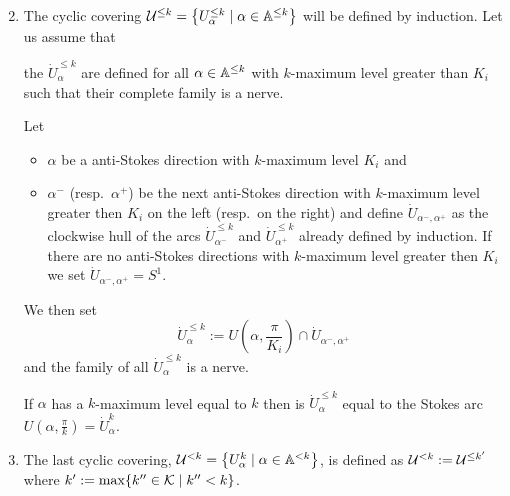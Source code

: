 \begin{enumerate}
  \setcounter{enumi}{1}
  \item The cyclic covering
    $\mathcal{U}^{\leq k}=\left\{U_\alpha^{\leq k}\mid\alpha\in\mathbb{A}^{\leq k}\right\}$
    will be defined by induction.
    Let us assume that
    \begin{einr}
      the $\dot U_\alpha^{\leq k}$ are defined for all $\alpha\in\mathbb{A}^{\leq k}$
      with $k$-maximum level greater than $K_i$ such that their complete family
      is a nerve.
    \end{einr}
    Let
    \begin{itemize}
      \item $\alpha$ be a anti-Stokes direction with $k$-maximum level $K_i$
        and
      \item $\alpha^-$ (resp.\ $\alpha^+$) be the next anti-Stokes direction
        with $k$-maximum level greater then $K_i$ on the left (resp.\ on the
        right) and define $\dot U_{\alpha^-,\alpha^+}$ as the clockwise hull of
        the arcs $\dot U_{\alpha^-}^{\leq k}$ and $\dot U_{\alpha^+}^{\leq k}$
        already defined by induction.
        If there are no anti-Stokes directions with $k$-maximum level greater
        then $K_i$ we set $\dot U_{\alpha^-,\alpha^+}=S^1$.
    \end{itemize}
    We then set
    \[
      \dot U_\alpha^{\leq k}
        :=U\left(\alpha,\frac{\pi}{K_i}\right)\cap\dot U_{\alpha^-,\alpha^+}
    \]
    and the family of all $\dot U_\alpha^{\leq k}$ is a nerve.\PROBLEM[proof!]
    \begin{rem}
      If $\alpha$ has a $k$-maximum level equal to $k$ then is
      $\dot U_\alpha^{\leq k}$ equal to the Stokes arc
      $U\left(\alpha,\frac{\pi}{k}\right)=\dot U_\alpha^k$.
    \end{rem}
\end{enumerate}

\begin{enumerate}
  \setcounter{enumi}{2}
\item The last cyclic covering,
  $\mathcal{U}^{<k}=\left\{U_{\alpha}^k\mid\alpha\in\mathbb{A}^{<k}\right\}$, is defined as
  $\mathcal{U}^{<k}:=\mathcal{U}^{\leq k'}$ where $k':=\max\{k''\in\mathcal{K}\mid k''<k\}$.
\end{enumerate}


